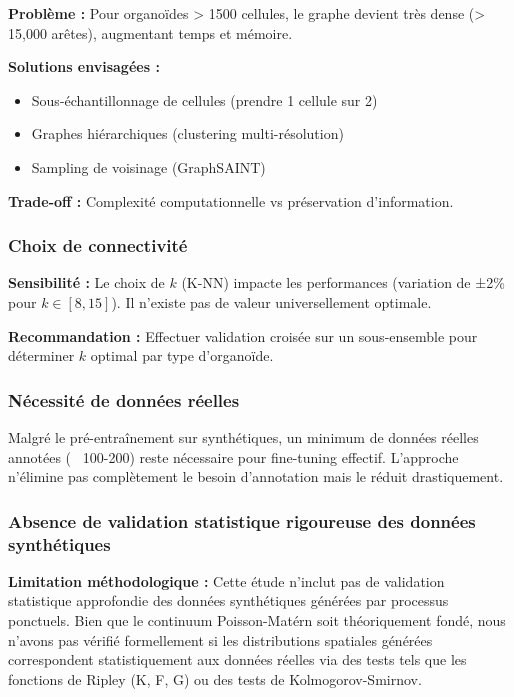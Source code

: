 \textbf{Problème :}
Pour organoïdes > 1500 cellules, le graphe devient très dense (> 15,000 arêtes), augmentant temps et mémoire.

\textbf{Solutions envisagées :}
\begin{itemize}
    \item Sous-échantillonnage de cellules (prendre 1 cellule sur 2)
    \item Graphes hiérarchiques (clustering multi-résolution)
    \item Sampling de voisinage (GraphSAINT)
\end{itemize}

\textbf{Trade-off :}
Complexité computationnelle vs préservation d'information.

\subsubsection{Choix de connectivité}

\textbf{Sensibilité :}
Le choix de $k$ (K-NN) impacte les performances (variation de ±2\% pour $k \in [8, 15]$). Il n'existe pas de valeur universellement optimale.

\textbf{Recommandation :}
Effectuer validation croisée sur un sous-ensemble pour déterminer $k$ optimal par type d'organoïde.

\subsubsection{Nécessité de données réelles}

Malgré le pré-entraînement sur synthétiques, un minimum de données réelles annotées (~ 100-200) reste nécessaire pour fine-tuning effectif. L'approche n'élimine pas complètement le besoin d'annotation mais le réduit drastiquement.

\subsubsection{Absence de validation statistique rigoureuse des données synthétiques}

\textbf{Limitation méthodologique :}
Cette étude n'inclut pas de validation statistique approfondie des données synthétiques générées par processus ponctuels. Bien que le continuum Poisson-Matérn soit théoriquement fondé, nous n'avons pas vérifié formellement si les distributions spatiales générées correspondent statistiquement aux données réelles via des tests tels que les fonctions de Ripley (K, F, G) ou des tests de Kolmogorov-Smirnov.

